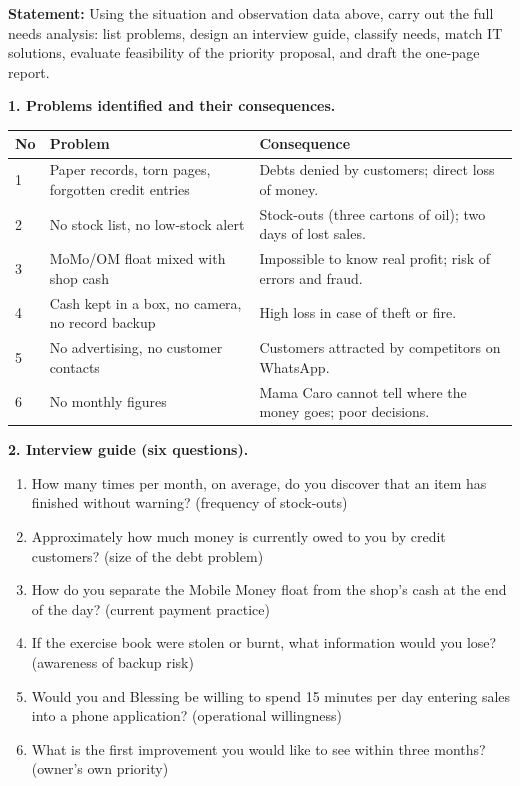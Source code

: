 \documentclass[11pt]{article}
\newcounter{popsec}
\newcounter{popsub}
\newcommand{\courssub}[1]{%
  \stepcounter{popsub}%
  \par\vspace{9pt}\noindent{\popxbold\fontsize{11.5}{13}\selectfont\color{popink}{\color{poporange}\thepopsec.\thepopsub}\hspace{6pt}#1}\par\nopagebreak\vspace{4pt}
}
\begin{document}
\courssub{Model Answer}

\begin{exoresolu}
\textbf{Statement:} Using the situation and observation data above, carry out the full needs analysis: list problems, design an interview guide, classify needs, match IT solutions, evaluate feasibility of the priority proposal, and draft the one-page report.

\tcblower

\textbf{1. Problems identified and their consequences.}

\begin{center}
\begin{tabularx}{\linewidth}{|l|X|X|}\hline
\rowcolor{popblueL} \textbf{No} & \textbf{Problem} & \textbf{Consequence} \\ \hline
1 & Paper records, torn pages, forgotten credit entries & Debts denied by customers; direct loss of money. \\ \hline
2 & No stock list, no low-stock alert & Stock-outs (three cartons of oil); two days of lost sales. \\ \hline
3 & MoMo/OM float mixed with shop cash & Impossible to know real profit; risk of errors and fraud. \\ \hline
4 & Cash kept in a box, no camera, no record backup & High loss in case of theft or fire. \\ \hline
5 & No advertising, no customer contacts & Customers attracted by competitors on WhatsApp. \\ \hline
6 & No monthly figures & Mama Caro cannot tell where the money goes; poor decisions. \\ \hline
\end{tabularx}
\end{center}

\textbf{2. Interview guide (six questions).}

\begin{enumerate}
\item How many times per month, on average, do you discover that an item has finished without warning? (frequency of stock-outs)
\item Approximately how much money is currently owed to you by credit customers? (size of the debt problem)
\item How do you separate the Mobile Money float from the shop's cash at the end of the day? (current payment practice)
\item If the exercise book were stolen or burnt, what information would you lose? (awareness of backup risk)
\item Would you and Blessing be willing to spend 15 minutes per day entering sales into a phone application? (operational willingness)
\item What is the first improvement you would like to see within three months? (owner's own priority)
\end{enumerate}


\end{exoresolu}
\end{document}
